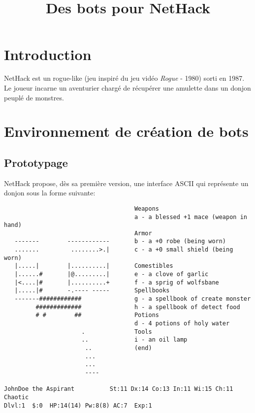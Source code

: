 \documentclass{article}
\title{Des bots pour NetHack}
\begin{document}
\maketitle
\tableofcontents

\pagebreak

\section{Introduction}

NetHack est un rogue-like (jeu inspiré du jeu vidéo \emph{Rogue} - 1980)
sorti en 1987. Le joueur incarne un aventurier chargé de récupérer une
amulette dans un donjon peuplé de monstres.


\section{Environnement de création de bots}

\subsection{Prototypage}

NetHack propose, dès sa première version, une interface ASCII qui représente un donjon sous la forme suivante:

\begin{verbatim}
                                     Weapons
                                     a - a blessed +1 mace (weapon in hand)
                                     Armor
   -------        ------------       b - a +0 robe (being worn)
   .......         ........>.|       c - a +0 small shield (being worn)
   |.....|        |..........|       Comestibles
   |......#       |@.........|       e - a clove of garlic
   |<....|#       |..........+       f - a sprig of wolfsbane
   |.....|#       -.---- -----       Spellbooks
   -------############               g - a spellbook of create monster
         #############               h - a spellbook of detect food
         # #        ##               Potions
                                     d - 4 potions of holy water
                      .              Tools
                      ..             i - an oil lamp
                       ..            (end) 
                       ...
                       ...
                       ----

JohnDoe the Aspirant          St:11 Dx:14 Co:13 In:11 Wi:15 Ch:11  Chaotic
Dlvl:1  $:0  HP:14(14) Pw:8(8) AC:7  Exp:1
\end{verbatim}
\end{document}
